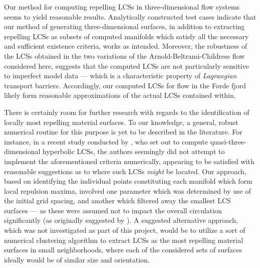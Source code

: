 Our method for computing repelling LCSs in three-dimensional flow systems
seems to yield reasonable results. Analytically constructed test cases indicate
that our method of generating three-dimensional surfaces, in addition to
extracting repelling LCSs as subsets of computed manifolds which satisfy all
the necessary and sufficient existence criteria, works as intended. Moreover,
the robustness of the LCSs obtained in the two variations of the
Arnold-Beltrami-Childress flow considered here, suggests that the computed LCSs
are not particularly sensitive to imperfect model data --- which is a
characteristic property of \emph{Lagrangian} transport barriers. Accordingly,
our computed LCSs for flow in the Førde fjord likely form reasonable
approximations of the actual LCSs contained within.

There is certainly room for further research with regards to the identification
of locally most repelling material surfaces. To our knowledge, a general,
robust numerical routine for this purpose is yet to be described in the
literature. For instance, in a recent study conducted by
\textcite{oettinger2016autonomous}, who set out to compute
quasi-three-dimensional hyperbolic LCSs, the authors seemingly did not attempt
to implement the aforementioned criteria numerically, appearing to be satisfied
with reasonable suggestions as to where such LCSs \emph{might} be located. Our
approach, based on identifying the individual points constituting each manifold
which form local repulsion maxima, involved one parameter which was determined
by use of the initial grid spacing, and another which filtered away the
smallest LCS surfaces --- as these were assumed not to impact the overall
circulation significantly (as originally suggested by
\textcite{farazmand2012computing}). A suggested alternative approach, which was
not investigated as part of this project, would be to utilize a sort of
numerical clustering algorithm to extract LCSs as the most repelling material
surfaces in small neighborhoods, where each of the considered sets of surfaces
ideally would be of similar size and orientation.

